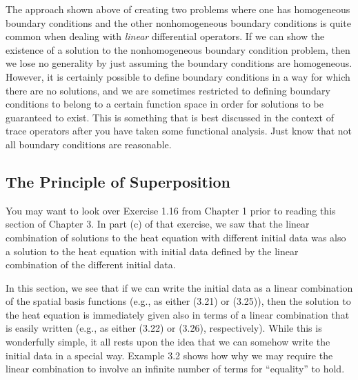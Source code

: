 \documentclass{amsart}
\theoremstyle{plain}
\theoremstyle{definition}
\theoremstyle{remark}
\theoremstyle{definition}
\numberwithin{equation}{section}
\numberwithin{equation}{section}
\begin{document}
The approach shown above of creating two problems where one has homogeneous boundary conditions and the other nonhomogeneous boundary conditions is quite common when dealing with {\em linear} differential operators. 
If we can show the existence of a solution to the nonhomogeneous boundary condition problem, then we lose no generality by just assuming the boundary conditions are homogeneous.
However, it is certainly possible to define boundary conditions in a way for which there are no solutions, and we are sometimes restricted to defining boundary conditions to belong to a certain function space in order for solutions to be guaranteed to exist. 
This is something that is best discussed in the context of trace operators after you have taken some functional analysis. 
Just know that not all boundary conditions are reasonable.

\subsection{The Principle of Superposition}

You may want to look over Exercise 1.16 from Chapter 1 prior to reading this section of Chapter 3.
In part (c) of that exercise, we saw that the linear combination of solutions to the heat equation with different initial data was also a solution to the heat equation with initial data defined by the linear combination of the different initial data. 

In this section, we see that if we can write the initial data as a linear combination of the spatial basis functions (e.g., as either (3.21) or (3.25)), then the solution to the heat equation is immediately given also in terms of a linear combination that is easily written (e.g., as either (3.22) or (3.26), respectively). 
While this is wonderfully simple, it all rests upon the idea that we can somehow write the initial data in a special way.
Example 3.2 shows how why we may require the linear combination to involve an infinite number of terms for ``equality'' to hold.
\end{document}
